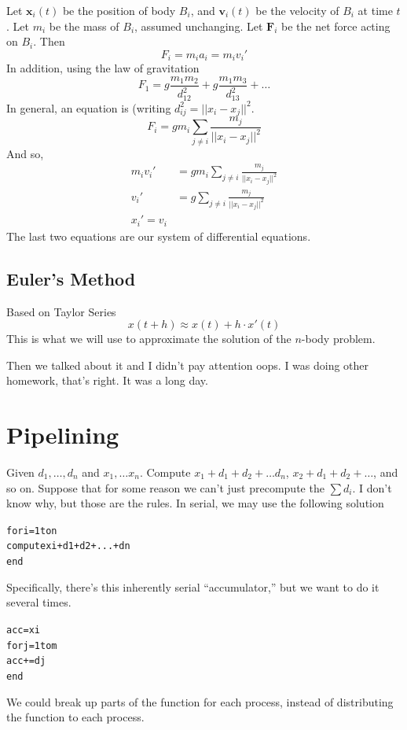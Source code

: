 \documentclass[12pt]{article}
\numberwithin{equation}{section}
\newcommand{\vect}[1] {\mathbf{#1}} %
\newcommand{\magn}[1]{\lvert\lvert#1\rvert\rvert} %
\theoremstyle{theorem}
\theoremstyle{definition}
\theoremstyle{remark}
\begin{document}
Let $\vect{x}_i(t)$ be the position of body $B_i$, and $\vect{v}_i(t)$ be the velocity of $B_i$ at time $t$.  Let $m_i$ be the mass of $B_i$, assumed unchanging.  Let $\vect{F}_i$ be the net force acting on $B_i$. Then
\begin{equation}
F_i = m_ia_i = m_iv_i'
\end{equation}
In addition, using the law of gravitation
\begin{equation}
F_1 = g\frac{m_1m_2}{d_{12}^2} + g\frac{m_1m_3}{d_{13}^2} + \dots
\end{equation}
In general, an equation is (writing $d_{ij}^2 = \magn{x_i - x_j}^2$.
\begin{equation}
F_i = gm_i \sum_{j\neq i} \frac{m_j}{\magn{x_i - x_j}^2}
\end{equation}
And so,
\begin{align}
m_iv_i' &= gm_i \sum_{j\neq i} \frac{m_j}{\magn{x_i - x_j}^2} \\
v_i' &= g \sum_{j\neq i} \frac{m_j}{\magn{x_i - x_j}^2} \\
x_i' = v_i
\end{align}
The last two equations are our system of differential equations. 

\subsection{Euler's Method}
Based on Taylor Series
\begin{equation}
x(t+h) \approx x(t) + h\cdot x'(t)
\end{equation}
This is what we will use to approximate the solution of the $n$-body problem. 

Then we talked about it and I didn't pay attention oops. I was doing other homework, that's right.  It was a long day.

\section{Pipelining}
\date{April 27, 2015}
Given $d_1, \dots, d_n$ and $x_1, \dots x_n$.  Compute $x_1 + d_1 + d_2 + \dots d_n$, $x_2 + d_1 + d_2 + \dots$, and so on.  Suppose that for some reason we can't just precompute the $\sum d_i$.  I don't know why, but those are the rules.  In serial, we may use the following solution
\begin{alltt}
for i = 1 to n
  compute xi + d1 + d2 + ... + dn
end
\end{alltt}
Specifically, there's this inherently serial ``accumulator,'' but we want to do it several times.  
\begin{alltt}
acc = xi
for j = 1 to m
  acc += dj
end
\end{alltt}
We could break up parts of the function for each process, instead of distributing the function to each process.
\end{document}
